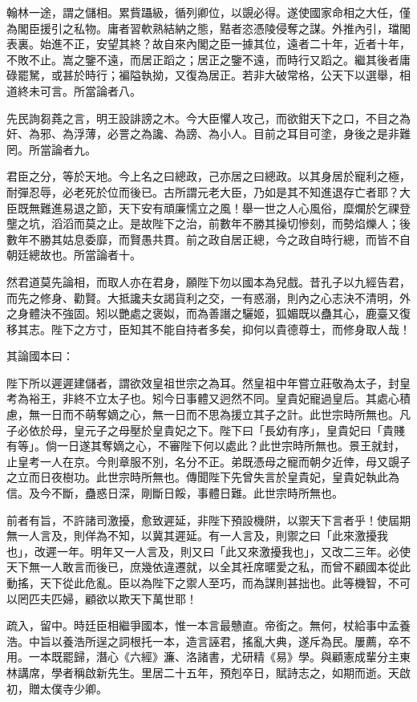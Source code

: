 \begin{pinyinscope}
翰林一途，謂之儲相。累貲躡級，循列卿位，以覬必得。遂使國家命相之大任，僅為閣臣援引之私物。庸者習軟熟結納之態，黠者恣憑陵侵奪之謀。外推內引，璫閣表裏。始進不正，安望其終？故自來內閣之臣一據其位，遠者二十年，近者十年，不敗不止。嵩之鑒不遠，而居正蹈之；居正之鑒不遠，而時行又蹈之。繼其後者庸碌罷駑，或甚於時行；褊隘執拗，又復為居正。若非大破常格，公天下以選舉，相道終未可言。所當論者八。

先民詢芻蕘之言，明王設誹謗之木。今大臣懼人攻己，而欲鉗天下之口，不目之為奸、為邪、為浮薄，必詈之為讒、為謗、為小人。目前之耳目可塗，身後之是非難罔。所當論者九。

君臣之分，等於天地。今上名之曰總政，己亦居之曰總政。以其身居於寵利之極，耐彈忍辱，必老死於位而後已。古所謂元老大臣，乃如是其不知進退存亡者耶？大臣既無難進易退之節，天下安有頑廉懦立之風！舉一世之人心風俗，糜爛於乞祼登壟之坑，滔滔而莫之止。是故陛下之治，前數年不勝其操切慘刻，而勢焰爍人；後數年不勝其姑息委靡，而賢愚共貫。前之政自居正總，今之政自時行總，而皆不自朝廷總故也。所當論者十。

然君道莫先論相，而取人亦在君身，願陛下勿以國本為兒戲。昔孔子以九經告君，而先之修身、勸賢。大抵讒夫女謁貨利之交，一有惑溺，則內之心志決不清明，外之身體決不強固。矧以艷處之褒姒，而為善譖之驪姬，狐媚既以蠱其心，鹿臺又復移其志。陛下之方寸，臣知其不能自持者多矣，抑何以貴德尊士，而修身取人哉！

其論國本曰：

陛下所以遲遲建儲者，謂欲效皇祖世宗之為耳。然皇祖中年嘗立莊敬為太子，封皇考為裕王，非終不立太子也。矧今日事體又迥然不同。皇貴妃寵過皇后。其處心積慮，無一日而不萌奪嫡之心，無一日而不思為援立其子之計。此世宗時所無也。凡子必依於母，皇元子之母壓於皇貴妃之下。陛下曰「長幼有序」，皇貴妃曰「貴賤有等」。倘一日遂其奪嫡之心，不審陛下何以處此？此世宗時所無也。景王就封，止皇考一人在京。今則章服不別，名分不正。弟既憑母之寵而朝夕近倖，母又覬子之立而日夜樹功。此世宗時所無也。傳聞陛下先曾失言於皇貴妃，皇貴妃執此為信。及今不斷，蠱惑日深，剛斷日餒，事體日難。此世宗時所無也。

前者有旨，不許諸司激擾，愈致遲延，非陛下預設機阱，以禦天下言者乎！使屆期無一人言及，則佯為不知，以冀其遲延。有一人言及，則禦之曰「此來激擾我也」，改遲一年。明年又一人言及，則又曰「此又來激擾我也」，又改二三年。必使天下無一人敢言而後已，庶幾依違遷就，以全其衽席暱愛之私，而曾不顧國本從此動搖，天下從此危亂。臣以為陛下之禦人至巧，而為謀則甚拙也。此等機智，不可以罔匹夫匹婦，顧欲以欺天下萬世耶！

疏入，留中。時廷臣相繼爭國本，惟一本言最戇直。帝銜之。無何，杖給事中孟養浩。中旨以養浩所逞之詞根托一本，造言誣君，搖亂大典，遂斥為民。屢薦，卒不用。一本既罷歸，潛心《六經》濂、洛諸書，尤研精《易》學。與顧憲成輩分主東林講席，學者稱啟新先生。里居二十五年，預剋卒日，賦詩志之，如期而逝。天啟初，贈太僕寺少卿。


\end{pinyinscope}
